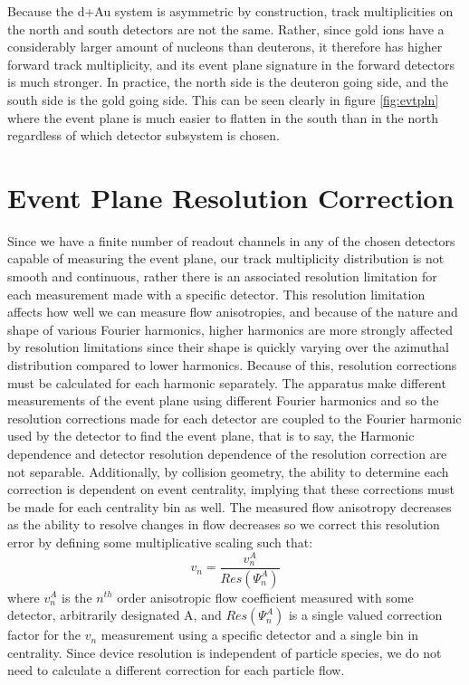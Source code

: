 Because the d+Au system is asymmetric by construction, track multiplicities on the north and south detectors are not the same. Rather, since gold ions have a considerably larger amount of nucleons than deuterons, it therefore has higher forward track multiplicity, and its event plane signature in the forward detectors is much stronger. In practice, the north side is the deuteron going side, and the south side is the gold going side. This can be seen clearly in figure \ref{fig:evtpln} where the event plane is much easier to flatten in the south than in the north regardless of which detector subsystem is chosen.

\section{Event Plane Resolution Correction}
\label{sect:epres}
Since we have a finite number of readout channels in any of the chosen detectors capable of measuring the event plane, our track multiplicity distribution is not smooth and continuous, rather there is an associated resolution limitation for each measurement made with a specific detector. This resolution limitation affects how well we can measure flow anisotropies, and because of the nature and shape of various Fourier harmonics, higher harmonics are more strongly affected by resolution limitations since their shape is quickly varying over the azimuthal distribution compared to lower harmonics. Because of this, resolution corrections must be calculated for each harmonic separately. The apparatus make different measurements of the event plane using different Fourier harmonics and so the resolution corrections made for each detector are coupled to the Fourier harmonic used by the detector to find the event plane, that is to say, the Harmonic dependence and detector resolution dependence of the resolution correction are not separable. Additionally, by collision geometry, the ability to determine each correction is dependent on event centrality, implying that these corrections must be made for each centrality bin as well. The measured flow anisotropy decreases as the ability to resolve changes in flow decreases so we correct this resolution error by defining some multiplicative scaling such that:
\begin{equation}
v_n = \frac{v_n^{A}}{Res(\Psi_n^A)}
\end{equation}
where $v_n^{A}$ is the $n^{th}$ order anisotropic flow coefficient measured with some detector, arbitrarily designated A, and $Res(\Psi_n^A)$ is a single valued correction factor for the $v_n$ measurement using a specific detector and a single bin in centrality. Since device resolution is independent of particle species, we do not need to calculate a different correction for each particle flow. 

